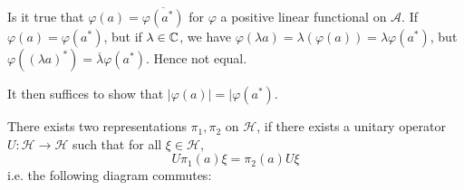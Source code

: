 Is it true that $\varphi(a)=\overline{\varphi(a^*)}$ for $\varphi$ a positive linear functional on $\mathcal{A}$.
If $\varphi(a)=\varphi(a^*)$, but if $\lambda\in\mathbb{C}$, we have $\varphi(\lambda a)=\lambda (\varphi(a))=\lambda\varphi(a^*)$, but $\varphi((\lambda a)^*)=\overline{\lambda}\varphi(a^*)$. Hence not equal.

It then suffices to show that $|\varphi(a)|=|\varphi(a^*)$.

\begin{definition}
    There exists two representations $\pi_1, \pi_2$ on $\mathcal{H}$, if there exists a unitary operator $U: \mathcal{H}\to\mathcal{H}$ such that for all $\xi\in\mathcal{H}$,
    \begin{equation*}
        U\pi_1(a)\xi=\pi_2(a)U\xi
    \end{equation*}
    i.e. the following diagram commutes:
\end{definition}

